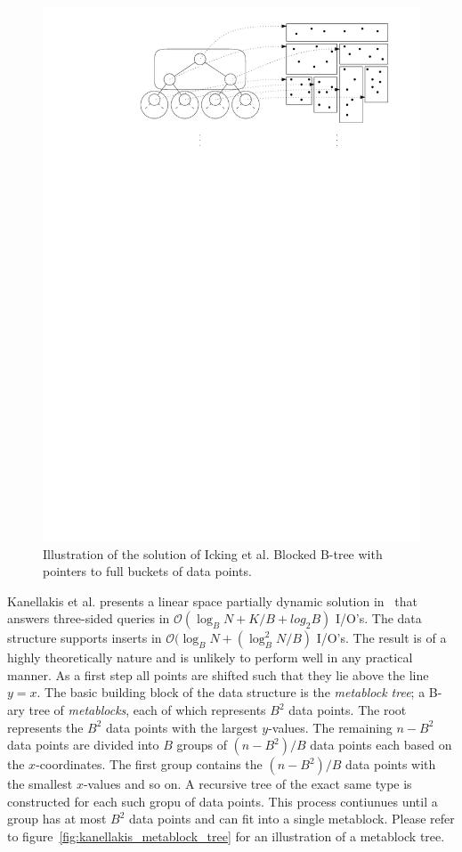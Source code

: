 \documentclass[twoside,11pt,openright]{report}
\begin{document}
\begin{figure}[h]
	\centering
		\includegraphics[width=\textwidth]{../figures/icking_external_pst}
	\caption{Illustration of the solution of Icking et al. Blocked B-tree with pointers to full buckets of data points.}
	\label{fig:icking_external_pst}
\end{figure}

Kanellakis et al. presents a linear space partially dynamic solution in~\cite{Kanellakis1996589} that answers three-sided queries in $\mathcal{O}(\log_B N + K/B + log_2 B)$ I/O's. The data structure supports inserts in $\mathcal{O}(\log_B N + (\log^2_B N / B)$ I/O's. The result is of a highly theoretically nature and is unlikely to perform well in any practical manner. As a first step all points are shifted such that they lie above the line $y = x$. The basic building block of the data structure is the \textit{metablock tree}; a B-ary tree of \textit{metablocks}, each of which represents $B^2$ data points. The root represents the $B^2$ data points with the largest $y$-values. The remaining $n - B^2$ data points are divided into $B$ groups of $(n - B^2)/B$ data points each based on the $x$-coordinates. The first group contains the $(n - B^2)/B$ data points with the smallest $x$-values and so on. A recursive tree of the exact same type is constructed for each such gropu of data points. This process contiunues until a group has at most $B^2$ data points and can fit into a single metablock. Please refer to figure~\ref{fig:kanellakis_metablock_tree} for an illustration of a metablock tree.
\end{document}
